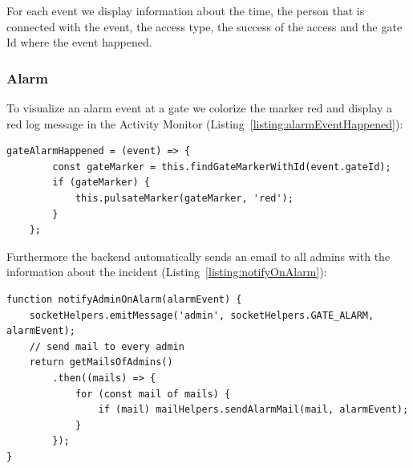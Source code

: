 For each event we display information about the time, the person that is connected with the event, the access type, the success of the access and the gate Id where the event happened.

\subsubsection{Alarm}

To visualize an alarm event at a gate we colorize the marker red and display a red log message in the Activity Monitor (Listing~\ref{listing:alarmEventHappened}):

\begin{lstlisting}[label={listing:alarmEventHappened},caption={Handling gate alarm events in frontend}]
gateAlarmHappened = (event) => {
        const gateMarker = this.findGateMarkerWithId(event.gateId);
        if (gateMarker) {
            this.pulsateMarker(gateMarker, 'red');
        }
    };
\end{lstlisting}

Furthermore the backend automatically sends an email to all admins with the information about the incident (Listing~\ref{listing:notifyOnAlarm}):

\begin{lstlisting}[label={listing:notifyOnAlarm},caption={Notifying admins on alarm event}]
function notifyAdminOnAlarm(alarmEvent) {
    socketHelpers.emitMessage('admin', socketHelpers.GATE_ALARM, alarmEvent);
    // send mail to every admin
    return getMailsOfAdmins()
        .then((mails) => {
            for (const mail of mails) {
                if (mail) mailHelpers.sendAlarmMail(mail, alarmEvent);
            }
        });
}
\end{lstlisting}

\clearpage
